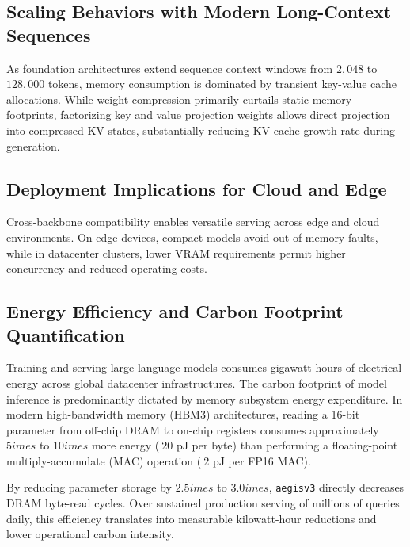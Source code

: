 \subsection{Scaling Behaviors with Modern Long-Context Sequences}
As foundation architectures extend sequence context windows from $2{,}048$ to $128{,}000$ tokens, memory consumption is dominated by transient key-value cache allocations. While weight compression primarily curtails static memory footprints, factorizing key and value projection weights allows direct projection into compressed KV states, substantially reducing KV-cache growth rate during generation.

\subsection{Deployment Implications for Cloud and Edge}
Cross-backbone compatibility enables versatile serving across edge and cloud environments. On edge devices, compact models avoid out-of-memory faults, while in datacenter clusters, lower VRAM requirements permit higher concurrency and reduced operating costs.

\subsection{Energy Efficiency and Carbon Footprint Quantification}
Training and serving large language models consumes gigawatt-hours of electrical energy across global datacenter infrastructures. The carbon footprint of model inference is predominantly dictated by memory subsystem energy expenditure. In modern high-bandwidth memory (HBM3) architectures, reading a 16-bit parameter from off-chip DRAM to on-chip registers consumes approximately $5	imes$ to $10	imes$ more energy ($~20$ pJ per byte) than performing a floating-point multiply-accumulate (MAC) operation ($~2$ pJ per FP16 MAC).

By reducing parameter storage by $2.5	imes$ to $3.0	imes$, \texttt{aegisv3} directly decreases DRAM byte-read cycles. Over sustained production serving of millions of queries daily, this efficiency translates into measurable kilowatt-hour reductions and lower operational carbon intensity.
